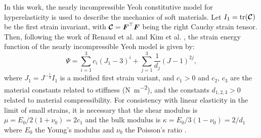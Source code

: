 In this work, the nearly incompressible Yeoh constitutive model for hyperelasticity is used to describe the mechanics of soft materials. Let $I_1 = \textrm{tr}(\boldsymbol{\mathcal{C}})$ be the first strain invariant, with $\boldsymbol{\mathcal{C}} = \boldsymbol{F}^\top \boldsymbol{F}$ being the right Cauchy strain tensor. Then, following the work of Renaud et al. \cite{Renaud2011} and Kim et al. \cite{Kim2018}, the strain energy function of the nearly incompressible Yeoh model is given by:
%
\begin{equation}
{\Psi} = \sum_{i = 1}^{3} c_i (J_1 - 3)^i + \sum_{j = 1}^{3} \frac{1}{d_j} (J - 1)^{2j},
\label{eq:C3:psi_model_yeoh}
\end{equation}
%
where $J_1 = J^{-\tfrac{1}{3}} I_1$ is a modified first strain variant, and $c_1 > 0$ and $c_2$, $c_3$ are the material constants related to stiffness (\si{\newton \per \square \meter}), and the constants $d_{1,2,3} > 0$ related to material compressibility. For consistency with linear elasticity in the limit of small strains, it is necessary that the shear modulus is $\mu = {E_0}/{2(1+\nu_0)} = 2 c_1$ and the bulk modulus is $\kappa = {E_0}/{3(1-\nu_0)} = {2}/{d_1}$ where $E_0$ the Young's modulus and $\nu_0$ the Poisson's ratio \cite{Holzapfel2002,Kim2018}. %


